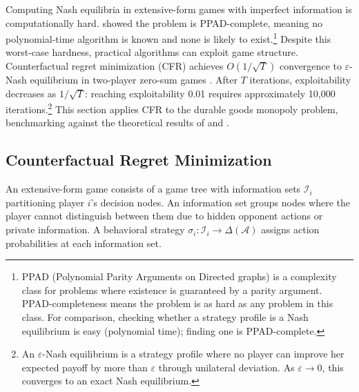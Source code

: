 
Computing Nash equilibria in extensive-form games with imperfect information is computationally hard. \citet{Daskalakis2009} showed the problem is PPAD-complete, meaning no polynomial-time algorithm is known and none is likely to exist.\footnote{PPAD (Polynomial Parity Arguments on Directed graphs) is a complexity class for problems where existence is guaranteed by a parity argument. PPAD-completeness means the problem is as hard as any problem in this class. For comparison, checking whether a strategy profile is a Nash equilibrium is easy (polynomial time); finding one is PPAD-complete.} Despite this worst-case hardness, practical algorithms can exploit game structure. Counterfactual regret minimization (CFR) achieves $O(1/\sqrt{T})$ convergence to $\varepsilon$-Nash equilibrium in two-player zero-sum games \citep{zinkevich2008}. After $T$ iterations, exploitability decreases as $1/\sqrt{T}$: reaching exploitability 0.01 requires approximately 10,000 iterations.\footnote{An $\varepsilon$-Nash equilibrium is a strategy profile where no player can improve her expected payoff by more than $\varepsilon$ through unilateral deviation. As $\varepsilon \to 0$, this converges to an exact Nash equilibrium.} This section applies CFR to the durable goods monopoly problem, benchmarking against the theoretical results of \citet{gul1986foundations} and \citet{ausubel1989reputation}.

\subsection{Counterfactual Regret Minimization}

An extensive-form game consists of a game tree with information sets $\mathcal{I}_i$ partitioning player $i$'s decision nodes. An information set groups nodes where the player cannot distinguish between them due to hidden opponent actions or private information. A behavioral strategy $\sigma_i: \mathcal{I}_i \to \Delta(\mathcal{A})$ assigns action probabilities at each information set.

